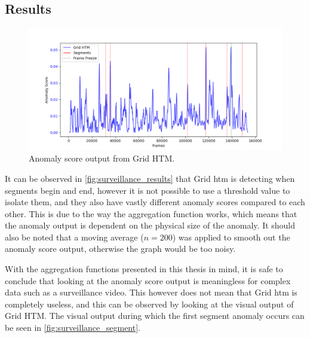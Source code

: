 \subsection{Results}
\begin{figure}[H]
    \centering
    \includegraphics[width=\textwidth]{resources/experiments/surveillance/surveillance_result}
    \caption[Grid HTM Anomaly Score Output]{Anomaly score output from Grid HTM.}
    \label{fig:surveillance_results}
\end{figure}
It can be observed in \autoref{fig:surveillance_results} that Grid \gls*{htm} is detecting when segments begin and end, however it is not possible to use a threshold value to isolate them, and they also have vastly different anomaly scores compared to each other. This is due to the way the aggregation function works, which means that the anomaly output is dependent on the physical size of the anomaly. It should also be noted that a moving average ($n=200$) was applied to smooth out the anomaly score output, otherwise the graph would be too noisy.
\par
With the aggregation functions presented in this thesis in mind, it is safe to conclude that looking at the anomaly score output is meaningless for complex data such as a surveillance video. This however does not mean that Grid \gls*{htm} is completely useless, and this can be observed by looking at the visual output of Grid HTM. The visual output during which the first segment anomaly occurs can be seen in \autoref{fig:surveillance_segment}.
